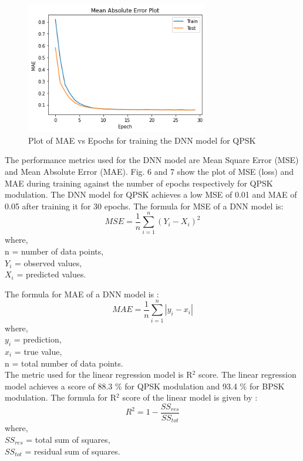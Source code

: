 \documentclass[conference]{IEEEtran}
\begin{document}
\begin{figure}[htbp]
\centerline{\includegraphics[width=8cm]{mae_qpsk_v2.png}}
\caption{Plot of MAE vs Epochs for training the DNN model for QPSK}
\label{mae_qpsk}
\end{figure}

The performance metrics used for the DNN model are Mean Square Error (MSE) and Mean Absolute Error (MAE). Fig. 6 and 7 show the plot of MSE (loss) and MAE during training against the number of epochs respectively for QPSK modulation. The DNN model for QPSK achieves a low MSE of 0.01 and MAE of 0.05 after training it for 30 epochs. The formula for MSE of a DNN model is:
\begin{equation}
     MSE = \displaystyle\frac{1}{n}\sum_{i=1}^{n}(Y_i - X_i)^2
\label{mse}
\end{equation}
where,\\
{n}	=	number of data points,\\
${Y_i}$	=	observed values,\\
${X_i}$	=	predicted values.

The formula for MAE of a DNN model is : 
\begin{equation}
    MAE = \frac{1}{n}\sum_{i=1}^{n}|y_i - x_i|
\end{equation}
where, \\
${y_i}$	=	prediction, \\
${x_i}$	=	true value, \\
{n}	=	total number of data points.\\

The metric used for the linear regression model is R$^{2}$ score. The linear regression model achieves a score of 88.3 \% for QPSK modulation and 93.4 \% for BPSK modulation. The formula for R$^{2}$ score of the linear model is given by : 
\begin{equation}
    R^{2} = {1 - \frac{SS_{res}}{SS_{tot}}}
\end{equation}
where,\\
${SS_{res}}$ = total sum of squares,\\
${SS_{tot}}$ = residual sum of squares.\\
\end{document}
